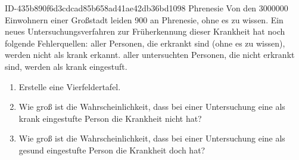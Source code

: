 \begin{exercise}
      {ID-435b890f6d3cdcad85b658ad41ae42db36bd1098}
      {Phrenesie}
  \ifproblem\problem
    Von den \num{3000000} Einwohnern einer Großstadt leiden 900 an Phrenesie,
    ohne es zu wissen. Ein neues Untersuchungsverfahren zur Früherkennung dieser
    Krankheit hat noch folgende Fehlerquellen:  aller Personen, die erkrankt
    sind (ohne es zu wissen), werden nicht als krank erkannt.  aller
    untersuchten Personen, die nicht erkrankt sind, werden als krank eingestuft.
    \begin{enumerate}
      \item Erstelle eine Vierfeldertafel.
      \item Wie groß ist die Wahrscheinlichkeit, dass bei einer Untersuchung
            eine als krank eingestufte Person die Krankheit nicht hat?
      \item Wie groß ist die Wahrscheinlichkeit, dass bei einer Untersuchung
            eine als gesund eingestufte Person die Krankheit doch hat?
    \end{enumerate}
  \fi
\end{exercise}
